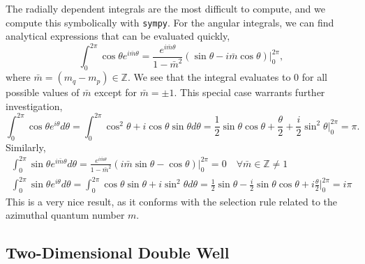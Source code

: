 The radially dependent integrals are the most difficult to compute, and we compute this 
symbolically with \lstinline{sympy}. For the angular integrals, we can find analytical 
expressions that can be evaluated quickly,
\begin{equation}
    \int_0^{2\pi} \cos \theta e^{i\bar{m} \theta} 
    = \frac{e^{i\bar{m}\theta}}{1 - \bar{m}^2}
        (\sin \theta - i \bar{m}\cos \theta)\Big\lvert_0^{2\pi},
\end{equation}
where $\bar{m} = (m_q - m_p) \in \mathbb{Z}$. We see that the integral evaluates to $0$ 
for all possible values of $\bar{m}$ except for $\bar{m}=\pm1$. This special case warrants further 
investigation,
\begin{equation}
        \int_0^{2\pi} \cos \theta e^{i\theta} d\theta 
        = \int_0^{2\pi} \cos^2\theta + i\cos\theta\sin \theta d\theta 
        = \frac{1}{2}\sin\theta\cos\theta + \frac{\theta}{2} + \frac{i}{2}\sin^2\theta
            \Big\lvert_0^{2\pi} = \pi.
\end{equation}
Similarly,
\begin{equation}
   \begin{gathered}
   \int_0^{2\pi} \sin\theta e^{i\bar{m}\theta}d\theta 
    = \frac{e^{i\bar{m}\theta}}{1 - \bar{m}^2}
        (i\bar{m}\sin\theta - \cos\theta)\Big\lvert_0^{2\pi}
        = 0 \quad \forall \bar{m} \in \mathbb{Z} \neq 1 \\
    \int_0^{2\pi} \sin \theta e^{i \theta} d\theta 
    = \int_0^{2\pi} \cos\theta \sin\theta + i \sin^2\theta d\theta
    = \frac{1}{2} \sin\theta - \frac{i}{2}\sin\theta\cos\theta + i\frac{\theta}{2}
        \Big\lvert_0^{2\pi} = i\pi
   \end{gathered}
\end{equation}
This is a very nice result, as it conforms with the selection rule related to the 
azimuthal quantum number $m$.

\subsection{Two-Dimensional Double Well}
\label{sec:2d_double_well}

